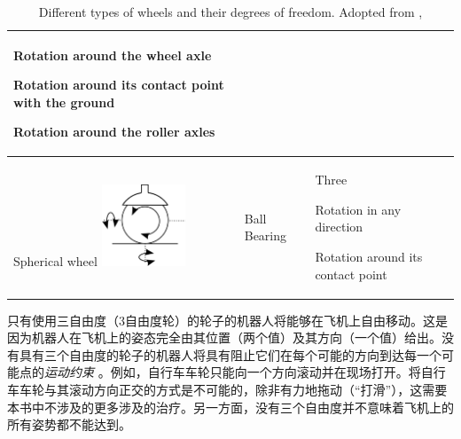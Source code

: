 \begin{table}
\begin{tabular}{p{2.8cm}p{3cm}p{4cm}}
\begin{compactitem}
\item Rotation around the wheel axle
\item Rotation around its contact point with the ground
\item Rotation around the roller axles
\end{compactitem}\\
\hline
Spherical wheel \includegraphics[width=2.5cm]{figs/wheeltype_spherical.png}& Ball Bearing & Three
\begin{compactitem}
\item Rotation in any direction
\item Rotation around its contact point
\end{compactitem}\\
\hline
\end{tabular}
\caption{Different types of wheels and their degrees of freedom. Adopted from \protect{},\label{tab:wheels}}
\end{table}


只有使用三自由度（3自由度轮）的轮子的机器人将能够在飞机上自由移动。这是因为机器人在飞机上的姿态完全由其位置（两个值）及其方向（一个值）给出。没有具有三个自由度的轮子的机器人将具有阻止它们在每个可能的方向到达每一个可能点的\emph {运动约束} 。例如，自行车车轮只能向一个方向滚动并在现场打开。将自行车车轮与其滚动方向正交的方式是不可能的，除非有力地拖动（“打滑”），这需要本书中不涉及的更多涉及的治疗。另一方面，没有三个自由度并不意味着飞机上的所有姿势都不能达到。

